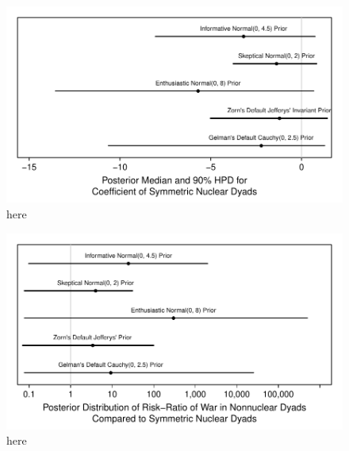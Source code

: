 \documentclass[12pt]{article}
\begin{document}
\begin{figure}[H]
\begin{center}
\includegraphics[scale = .8]{figs/bm-coef.pdf}
\caption{here}\label{fig:bm-coef}
\end{center}
\end{figure}

\begin{figure}[H]
\begin{center}
\includegraphics[scale = .8]{figs/bm-rr.pdf}
\caption{here}\label{fig:bm-rr}
\end{center}
\end{figure}





\clearpage


\end{document}
